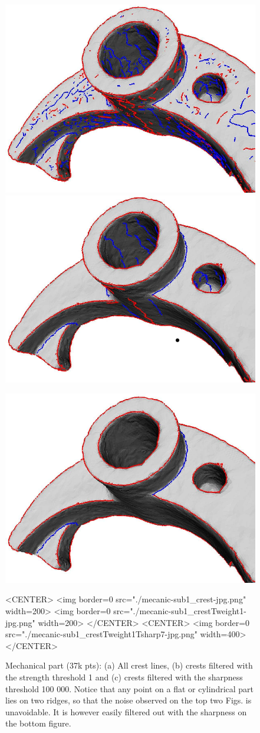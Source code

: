 \begin{figure}[htb] 
\begin{ccTexOnly}
\centerline{ 
\includegraphics[width=.45\linewidth]{Ridges_3/mecanic-sub1_crest-jpg}
\includegraphics[width=.45\linewidth]{Ridges_3/mecanic-sub1_crestTweight1-jpg}}
\centerline{
\includegraphics[width=.6\linewidth]{Ridges_3/mecanic-sub1_crestTweight1Tsharp7-jpg}}
\end{ccTexOnly}

\begin{ccHtmlOnly}
<CENTER> <img border=0 src="./mecanic-sub1_crest-jpg.png" width=200>
 <img border=0 src="./mecanic-sub1_crestTweight1-jpg.png" width=200>
</CENTER>
<CENTER>
 <img border=0 src="./mecanic-sub1_crestTweight1Tsharp7-jpg.png" width=400>
</CENTER>
\end{ccHtmlOnly}
\caption{Mechanical part (37k pts): (a) All crest lines, (b) crests filtered
with the strength threshold 1 and (c) crests filtered with the sharpness threshold 100 000.
Notice that any point on a flat or cylindrical part lies on two
ridges, so that the noise observed on the top two Figs. is
unavoidable. It is however easily filtered out with the sharpness on
the bottom figure.}
\label{fig:mechanical_crest_filtered-intro} 
\end{figure} 
